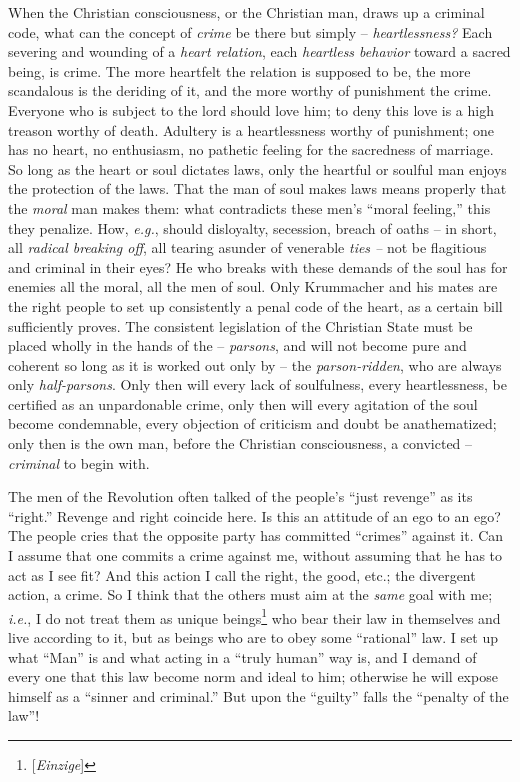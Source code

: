 When the Christian consciousness, or the Christian man, draws up a criminal 
code, what can the concept of \textit{crime} be there but simply -- 
\textit{heartlessness?} Each severing and wounding of a \textit{heart 
relation}, each \textit{heartless behavior} toward a sacred being, is crime. 
The more heartfelt the relation is supposed to be, the more scandalous is the 
deriding of it, and the more worthy of punishment the crime. Everyone who is 
subject to the lord should love him; to deny this love is a high treason 
worthy of death. Adultery is a heartlessness worthy of punishment; one has no 
heart, no enthusiasm, no pathetic feeling for the sacredness of marriage. So 
long as the heart or soul dictates laws, only the heartful or soulful man 
enjoys the protection of the laws. That the man of soul makes laws means 
properly that the \textit{moral} man makes them: what contradicts these men's 
``moral feeling,'' this they penalize. How, \textit{e.g.}, should 
disloyalty, secession, breach of oaths -- in short, all \textit{radical 
breaking off}, all tearing asunder of venerable \textit{ties --} not be 
flagitious and criminal in their eyes? He who breaks with these demands of the 
soul has for enemies all the moral, all the men of soul. Only Krummacher and 
his mates are the right people to set up consistently a penal code of the 
heart, as a certain bill sufficiently proves. The consistent legislation of 
the Christian State must be placed wholly in the hands of the -- 
\textit{parsons}, and will not become pure and coherent so long as it is 
worked out only by -- the \textit{parson-ridden}, who are always only 
\textit{half-parsons}. Only then will every lack of soulfulness, every 
heartlessness, be certified as an unpardonable crime, only then will every 
agitation of the soul become condemnable, every objection of criticism and 
doubt be anathematized; only then is the own man, before the Christian 
consciousness, a convicted -- \textit{criminal} to begin with.

The men of the Revolution often talked of the people's ``just revenge'' as 
its ``right.'' Revenge and right coincide here. Is this an attitude of an 
ego to an ego? The people cries that the opposite party has committed 
``crimes'' against it. Can I assume that one commits a crime against me, 
without assuming that he has to act as I see fit? And this action I call the 
right, the good, etc.; the divergent action, a crime. So I think that the 
others must aim at the \textit{same} goal with me; \textit{i.e.}, I do not 
treat them as unique beings\footnote{[\textit{Einzige}]} who bear their law in 
themselves and live according to it, but as beings who are to obey some 
``rational'' law. I set up what ``Man'' is and what acting in a ``truly 
human'' way is, and I demand of every one that this law become norm and ideal 
to him; otherwise he will expose himself as a ``sinner and criminal.'' But 
upon the ``guilty'' falls the ``penalty of the law''!

